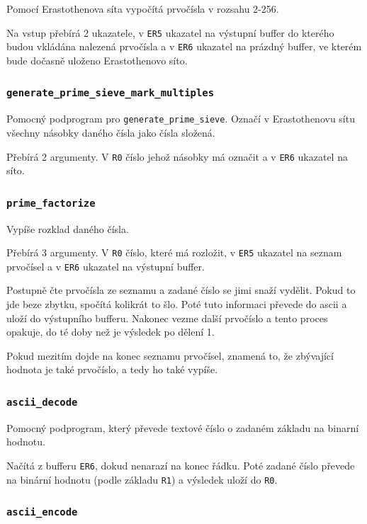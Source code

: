 \documentclass[12pt]{article}
\newcommand{\code}[1]{\colorbox{light-gray}{\mbox{\texttt{#1}}}}
\begin{document}
Pomocí Erastothenova síta vypočítá prvočísla v rozsahu 2-256.

Na vstup přebírá 2 ukazatele, v \code{ER5} ukazatel na výstupní buffer do kterého budou vkládána
nalezená prvočísla a v \code{ER6} ukazatel na prázdný buffer, ve kterém bude dočasně uloženo
Erastothenovo síto.

\subsubsection{\code{generate\_prime\_sieve\_mark\_multiples}}

Pomocný podprogram pro \code{generate\_prime\_sieve}. Označí v Erastothenovu sítu všechny násobky
daného čísla jako čísla složená.

Přebírá 2 argumenty. V \code{R0} číslo jehož násobky má označit a v \code{ER6} ukazatel na síto.

\subsubsection{\code{prime\_factorize}}

Vypíše rozklad daného čísla.

Přebírá 3 argumenty. V \code{R0} číslo, které má rozložit, v \code{ER5} ukazatel na seznam 
prvočísel a v \code{ER6} ukazatel na výstupní buffer.

Postupně čte prvočísla ze seznamu a zadané číslo se jimi snaží vydělit. Pokud to jde beze zbytku,
spočítá kolikrát to šlo. Poté tuto informaci převede do ascii a uloží do výstupního bufferu.
Nakonec vezme další prvočíslo a tento proces opakuje, do té doby než je výsledek po dělení 1.

Pokud mezitím dojde na konec seznamu prvočísel, znamená to, že zbývající hodnota je také prvočíslo,
a tedy ho také vypíše.

\subsubsection{\code{ascii\_decode}}

Pomocný podprogram, který převede textové číslo o zadaném základu na binarní hodnotu.

Načítá z bufferu \code{ER6}, dokud nenarazí na konec řádku. Poté zadané číslo převede na binární
hodnotu (podle základu \code{R1}) a výsledek uloží do \code{R0}.

\subsubsection{\code{ascii\_encode}}
\end{document}

